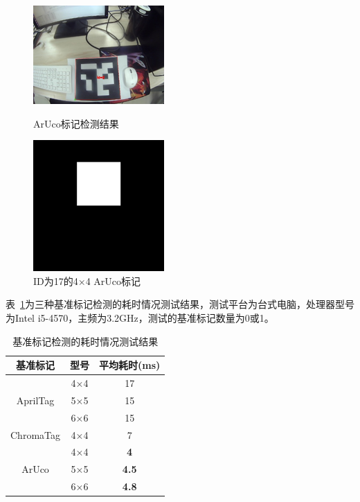 \begin{figure}[htb]
\begin{minipage}[t]{0.33\linewidth}
		\includegraphics[width=\columnwidth]{figures/4-3c.png} 
		\label{fig:4-3c} 
	\end{minipage}
	\caption{ArUco标记检测结果}
	\label{fig:4-3}
\end{figure}

\begin{figure}[htb]
	\centering
	\includegraphics[width=0.33\linewidth]{figures/4-4.png}
	\caption{ID为17的4×4 ArUco标记}
	\label{fig:4-4}
\end{figure}

表~\ref{tab:4-1}为三种基准标记检测的耗时情况测试结果，测试平台为台式电脑，处理器型号为Intel i5-4570，主频为3.2GHz，测试的基准标记数量为0或1。

\begin{table}[htb]
	\centering
	\caption{基准标记检测的耗时情况测试结果}
	\label{tab:4-1}
	\begin{tabular}{ccc}
		\toprule
		基准标记 & 型号  & 平均耗时(ms) \\
		\toprule
		\multirow{3}{*}{AprilTag}	& 4×4 & 17 \\
									& 5×5 & 15 \\
									& 6×6 & 15 \\
		\toprule
		ChromaTag 					& 4×4 & 7 \\ 	
		\toprule								
		\multirow{3}{*}{ArUco}		& 4×4 & \textbf{4} \\
									& 5×5 & \textbf{4.5} \\
									& 6×6 & \textbf{4.8} \\
		\toprule
	\end{tabular}
\end{table}

